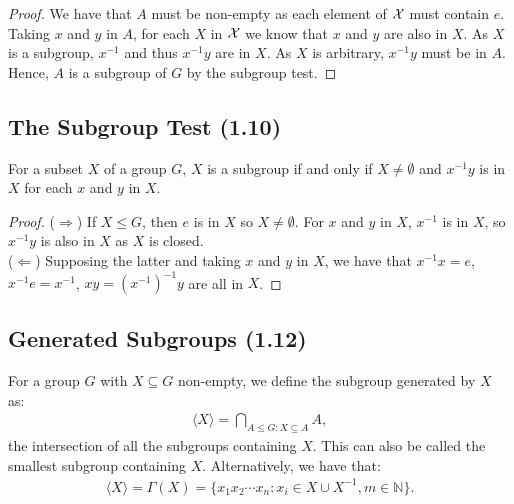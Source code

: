 \begin{proof} We have that $A$ must be non-empty as each element of $\mathcal{X}$
    must contain $e$. Taking $x$ and $y$ in $A$, for each $X$ in $\mathcal{X}$
    we know that $x$ and $y$ are also in $X$. As $X$ is a subgroup, $x^{-1}$ and
    thus $x^{-1}y$ are in $X$. As $X$ is arbitrary, $x^{-1}y$ must be in $A$.
    Hence, $A$ is a subgroup of $G$ by the subgroup test.
\end{proof}

\subsection{The Subgroup Test (1.10)} \label{1.10}

For a subset $X$ of a group $G$, $X$ is a subgroup if and only if 
$X \neq \emptyset$ and $x^{-1}y$ is in $X$ for each $x$ and $y$ in $X$.

\begin{proof}
    ($\Longrightarrow$) If $X \leq G$, then $e$ is in $X$ so 
    $X \neq \emptyset$. For $x$ and $y$ in $X$, $x^{-1}$ is 
    in $X$, so $x^{-1}y$ is also in $X$ as $X$ is closed.
    \\[\baselineskip]
    ($\Longleftarrow$) Supposing the latter and taking $x$ and $y$ 
    in $X$, we have that $x^{-1}x = e$, \linebreak
    $x^{-1}e = x^{-1}$,
    $xy = (x^{-1})^{-1}y$ are all in $X$.
\end{proof}

\newpage

\subsection{Generated Subgroups (1.12)} \label{1.12}

For a group $G$ with $X \subseteq G$ non-empty, we define the subgroup generated by $X$ as:
\begin{align*}
    \langle X \rangle = \bigcap_{A \leq G : X \subseteq A} A,
\end{align*} the intersection of all the subgroups containing $X$.
This can also be called the smallest subgroup containing $X$.
Alternatively, we have that: \begin{align*}
    \langle X \rangle = \Gamma(X) = \{x_1 x_2 \cdots x_n : x_i \in X \cup X^{-1}, m \in \mathbb{N} \}.
\end{align*}

